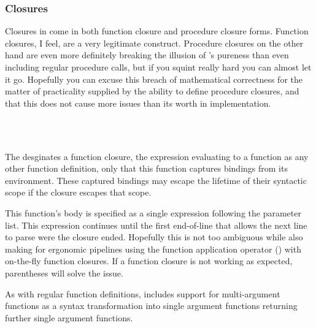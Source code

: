 \subsubsection{Closures}

Closures in \Trilogy{} come in both function closure and procedure closure forms.
Function closures, I feel, are a very legitimate construct. Procedure closures
on the other hand are even more definitely breaking the illusion of \Poetry{}'s
pureness than even including regular procedure calls, but if you squint really
hard you can almost let it go. Hopefully you can excuse this breach of mathematical
correctness for the matter of practicality supplied by the ability to define
procedure closures, and that this does not cause more issues than its worth
in implementation.

\begin{bnf*}
     \\
     \\
\end{bnf*}

The  desginates a function closure, the  expression evaluating
to a function as any other function definition, only that this function
captures bindings from its environment. These captured bindings may escape
the lifetime of their syntactic scope if the closure escapes that scope.

This function's body is specified as a single expression following the
parameter list. This expression continues until the first end-of-line that
allows the next line to parse were the closure ended. Hopefully this is not
too ambiguous while also making for ergonomic pipelines using the function
application operator (\op{|>}) with on-the-fly function closures. If a
function closure is not working as expected, parentheses will solve the
issue.

As with regular function definitions,  includes support for
multi-argument functions as a syntax transformation into single argument
functions returning further single argument functions.

